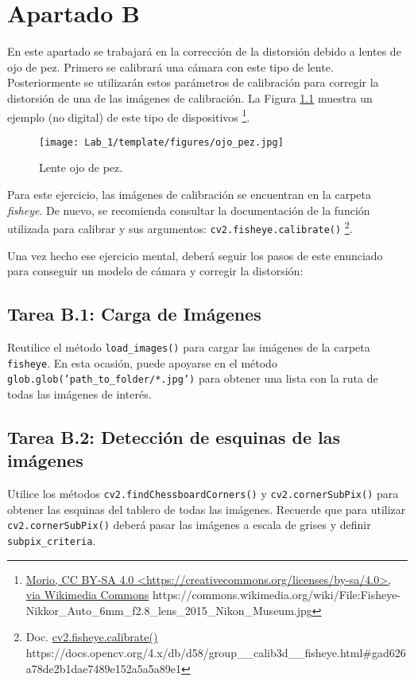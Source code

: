 \chapter{Apartado B}
\label{chapter:tarea_b}

En este apartado se trabajará en la corrección de la distorsión debido a lentes de ojo de pez. Primero se calibrará una cámara con este tipo de lente. Posteriormente se utilizarán estos parámetros de calibración para corregir la distorsión de una de las imágenes de calibración. La Figura \ref{fig:fisheye_camera} muestra un ejemplo (no digital) de este tipo de dispositivos \footnote{ \href{https://commons.wikimedia.org/wiki/File:Fisheye-Nikkor\_Auto\_6mm\_f2.8\_lens\_2015\_Nikon\_Museum.jpg}{Morio, CC BY-SA 4.0 <https://creativecommons.org/licenses/by-sa/4.0>, via Wikimedia Commons} https://commons.wikimedia.org/wiki/File:Fisheye-Nikkor\_Auto\_6mm\_f2.8\_lens\_2015\_Nikon\_Museum.jpg}.

\begin{figure}[h]
    \centering
    \texttt{[image: Lab\_1/template/figures/ojo\_pez.jpg]}
    \caption{Lente ojo de pez.}
    \label{fig:fisheye_camera}
\end{figure}

Para este ejercicio, las imágenes de calibración se encuentran en la carpeta \textit{fisheye}. De nuevo, se recomienda consultar la documentación de la función utilizada para calibrar y sus argumentos: \texttt{cv2.fisheye.calibrate()} \footnote{Doc. \href{https://docs.opencv.org/4.x/db/d58/group\_\_calib3d\_\_fisheye.html\#gad626a78de2b1dae7489e152a5a5a89e}{cv2.fisheye.calibrate()} https://docs.opencv.org/4.x/db/d58/group\_\_calib3d\_\_fisheye.html\#gad626a78de2b1dae7489e152a5a5a89e1}. 

Una vez hecho ese ejercicio mental, deberá seguir los pasos de este enunciado para conseguir un modelo de cámara y corregir la distorsión:

\section*{Tarea B.1: Carga de Imágenes}
Reutilice el método \texttt{load\_images()} para cargar las imágenes de la carpeta \texttt{fisheye}. En esta ocasión, puede apoyarse en el método \texttt{glob.glob('path\_to\_folder/*.jpg')} para obtener una lista con la ruta de todas las imágenes de interés.


\section*{Tarea B.2: Detección de esquinas de las imágenes}
Utilice los métodos \texttt{cv2.findChessboardCorners()} y \texttt{cv2.cornerSubPix()} para obtener las esquinas del tablero de todas las imágenes. Recuerde que para utilizar \texttt{cv2.cornerSubPix()} deberá pasar las imágenes a escala de grises y definir \texttt{subpix\_criteria}.

